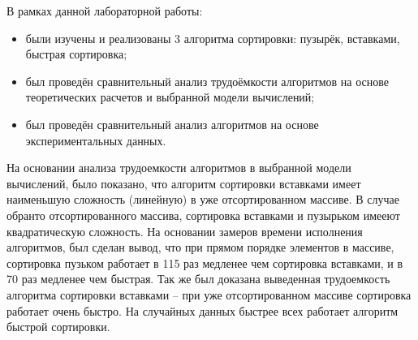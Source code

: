 \documentclass[12pt]{report}
\begin{document}
В рамках данной лабораторной работы:

\begin{itemize}
	\item были изучены и реализованы 3 алгоритма сортировки: пузырёк, вставками, быстрая сортировка;
	\item был проведён сравнительный анализ трудоёмкости алгоритмов на основе теоретических расчетов и выбранной модели вычислений;
	\item был проведён сравнительный анализ алгоритмов на основе экспериментальных данных.
\end{itemize}

На основании анализа трудоемкости алгоритмов в выбранной модели вычислений, было показано, что алгоритм сортировки вставками имеет наименьшую сложность (линейную) в уже отсортированном массиве. В случае обранто отсортированного массива, сортировка вставками и пузырьком имееют квадратическую сложность. На основании замеров времени исполнения алгоритмов, был сделан вывод, что при прямом порядке элементов в массиве, сортировка пузьком работает в 115 раз медленее чем сортировка вставками, и в 70 раз медленее чем быстрая. Так же был доказана выведенная трудоемкость алгоритма сортировки вставками -- при  уже отсортированном массиве сортировка работает очень быстро. На случайных данных быстрее всех работает алгоритм быстрой сортировки.




\end{document}
